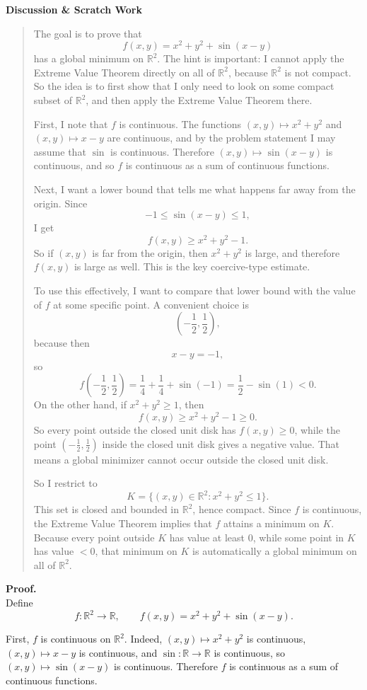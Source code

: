 \documentclass[12pt]{article}
\newenvironment{scratch}{%
  \par\smallskip
  \noindent\textbf{Discussion \& Scratch Work}\begin{quote}\small
}{%
  \end{quote}\smallskip
}
\begin{document}
\begin{scratch}
The goal is to prove that
\[
f(x,y)=x^2+y^2+\sin(x-y)
\]
has a global minimum on $\mathbb{R}^2$. The hint is important: I cannot apply the Extreme Value Theorem directly on all of $\mathbb{R}^2$, because $\mathbb{R}^2$ is not compact. So the idea is to first show that I only need to look on some compact subset of $\mathbb{R}^2$, and then apply the Extreme Value Theorem there.

First, I note that $f$ is continuous. The functions $(x,y)\mapsto x^2+y^2$ and $(x,y)\mapsto x-y$ are continuous, and by the problem statement I may assume that $\sin$ is continuous. Therefore $(x,y)\mapsto \sin(x-y)$ is continuous, and so $f$ is continuous as a sum of continuous functions.

Next, I want a lower bound that tells me what happens far away from the origin. Since
\[
-1\le \sin(x-y)\le 1,
\]
I get
\[
f(x,y)\ge x^2+y^2-1.
\]
So if $(x,y)$ is far from the origin, then $x^2+y^2$ is large, and therefore $f(x,y)$ is large as well. This is the key coercive-type estimate.

To use this effectively, I want to compare that lower bound with the value of $f$ at some specific point. A convenient choice is
\[
\left(-\frac12,\frac12\right),
\]
because then
\[
x-y=-1,
\]
so
\[
f\!\left(-\frac12,\frac12\right)
= \frac14+\frac14+\sin(-1)
= \frac12-\sin(1)<0.
\]
On the other hand, if $x^2+y^2\ge 1$, then
\[
f(x,y)\ge x^2+y^2-1\ge 0.
\]
So every point outside the closed unit disk has $f(x,y)\ge 0$, while the point $\left(-\frac12,\frac12\right)$ inside the closed unit disk gives a negative value. That means a global minimizer cannot occur outside the closed unit disk.

So I restrict to
\[
K=\{(x,y)\in\mathbb{R}^2:x^2+y^2\le 1\}.
\]
This set is closed and bounded in $\mathbb{R}^2$, hence compact. Since $f$ is continuous, the Extreme Value Theorem implies that $f$ attains a minimum on $K$. Because every point outside $K$ has value at least $0$, while some point in $K$ has value $<0$, that minimum on $K$ is automatically a global minimum on all of $\mathbb{R}^2$.
\end{scratch}

\textbf{Proof.}\\
Define
\[
f:\mathbb{R}^2\to\mathbb{R},
\qquad
f(x,y)=x^2+y^2+\sin(x-y).
\]

First, $f$ is continuous on $\mathbb{R}^2$. Indeed, $(x,y)\mapsto x^2+y^2$ is continuous, $(x,y)\mapsto x-y$ is continuous, and $\sin:\mathbb{R}\to\mathbb{R}$ is continuous, so $(x,y)\mapsto \sin(x-y)$ is continuous. Therefore $f$ is continuous as a sum of continuous functions.
\end{document}
